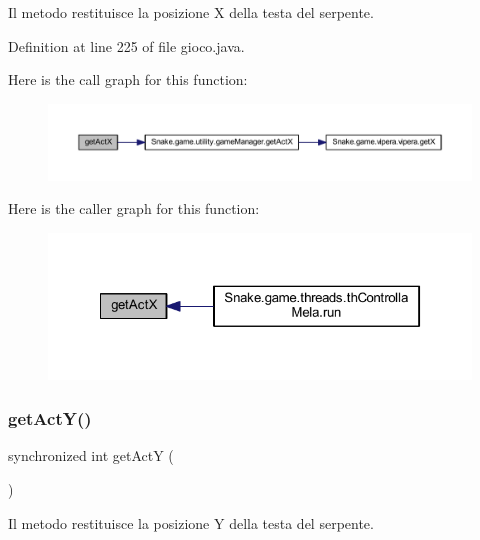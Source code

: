 Il metodo restituisce la posizione X della testa del serpente. 



Definition at line 225 of file gioco.\+java.

Here is the call graph for this function\+:
\nopagebreak
\begin{figure}[H]
\begin{center}
\leavevmode
\includegraphics[width=350pt]{class_snake_1_1game_1_1gioco_a0176af97fc1e2e7714a82049ab9a7069_cgraph}
\end{center}
\end{figure}
Here is the caller graph for this function\+:
\nopagebreak
\begin{figure}[H]
\begin{center}
\leavevmode
\includegraphics[width=322pt]{class_snake_1_1game_1_1gioco_a0176af97fc1e2e7714a82049ab9a7069_icgraph}
\end{center}
\end{figure}
\mbox{\label{class_snake_1_1game_1_1gioco_aedb81d58024c710a010bfa1c48f329f0}} 
\subsubsection{\texorpdfstring{get\+Act\+Y()}{getActY()}}
{\footnotesize\ttfamily synchronized int get\+ActY (\begin{DoxyParamCaption}{ }\end{DoxyParamCaption})}



Il metodo restituisce la posizione Y della testa del serpente. 



